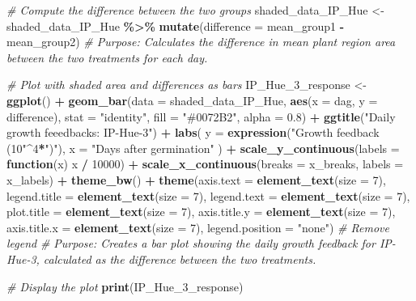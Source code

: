 \documentclass[
  11pt,
]{article}
\newenvironment{Shaded}{\begin{snugshade}}{\end{snugshade}}
\newcommand{\AttributeTok}[1]{\textcolor[rgb]{0.13,0.29,0.53}{#1}}
\newcommand{\CommentTok}[1]{\textcolor[rgb]{0.56,0.35,0.01}{\textit{#1}}}
\newcommand{\ControlFlowTok}[1]{\textcolor[rgb]{0.13,0.29,0.53}{\textbf{#1}}}
\newcommand{\DecValTok}[1]{\textcolor[rgb]{0.00,0.00,0.81}{#1}}
\newcommand{\FloatTok}[1]{\textcolor[rgb]{0.00,0.00,0.81}{#1}}
\newcommand{\FunctionTok}[1]{\textcolor[rgb]{0.13,0.29,0.53}{\textbf{#1}}}
\newcommand{\NormalTok}[1]{#1}
\newcommand{\OtherTok}[1]{\textcolor[rgb]{0.56,0.35,0.01}{#1}}
\newcommand{\SpecialCharTok}[1]{\textcolor[rgb]{0.81,0.36,0.00}{\textbf{#1}}}
\newcommand{\StringTok}[1]{\textcolor[rgb]{0.31,0.60,0.02}{#1}}
\begin{document}
\begin{Shaded}
\begin{Highlighting}[]
\CommentTok{\# Compute the difference between the two groups}
\NormalTok{shaded\_data\_IP\_Hue }\OtherTok{\textless{}{-}}\NormalTok{ shaded\_data\_IP\_Hue }\SpecialCharTok{\%\textgreater{}\%}
  \FunctionTok{mutate}\NormalTok{(}\AttributeTok{difference =}\NormalTok{ mean\_group1 }\SpecialCharTok{{-}}\NormalTok{ mean\_group2)}
\CommentTok{\# Purpose: Calculates the difference in mean plant region area between the two treatments for each day.}

\CommentTok{\# Plot with shaded area and differences as bars}
\NormalTok{IP\_Hue\_3\_response }\OtherTok{\textless{}{-}} \FunctionTok{ggplot}\NormalTok{() }\SpecialCharTok{+}
  \FunctionTok{geom\_bar}\NormalTok{(}\AttributeTok{data =}\NormalTok{ shaded\_data\_IP\_Hue, }\FunctionTok{aes}\NormalTok{(}\AttributeTok{x =}\NormalTok{ dag, }\AttributeTok{y =}\NormalTok{ difference), }\AttributeTok{stat =} \StringTok{"identity"}\NormalTok{, }\AttributeTok{fill =} \StringTok{"\#0072B2"}\NormalTok{, }\AttributeTok{alpha =} \FloatTok{0.8}\NormalTok{) }\SpecialCharTok{+}
  \FunctionTok{ggtitle}\NormalTok{(}\StringTok{"Daily growth feeedbacks: IP{-}Hue{-}3"}\NormalTok{) }\SpecialCharTok{+}
  \FunctionTok{labs}\NormalTok{(}
    \AttributeTok{y =} \FunctionTok{expression}\NormalTok{(}\StringTok{"Growth feedback (10"}\SpecialCharTok{\^{}}\DecValTok{4}\SpecialCharTok{*}\StringTok{")"}\NormalTok{), }
    \AttributeTok{x =} \StringTok{"Days after germination"}
\NormalTok{  ) }\SpecialCharTok{+}
  \FunctionTok{scale\_y\_continuous}\NormalTok{(}\AttributeTok{labels =} \ControlFlowTok{function}\NormalTok{(x) x }\SpecialCharTok{/} \DecValTok{10000}\NormalTok{) }\SpecialCharTok{+}
  \FunctionTok{scale\_x\_continuous}\NormalTok{(}\AttributeTok{breaks =}\NormalTok{ x\_breaks, }\AttributeTok{labels =}\NormalTok{ x\_labels) }\SpecialCharTok{+}
  \FunctionTok{theme\_bw}\NormalTok{() }\SpecialCharTok{+}
  \FunctionTok{theme}\NormalTok{(}\AttributeTok{axis.text =} \FunctionTok{element\_text}\NormalTok{(}\AttributeTok{size =} \DecValTok{7}\NormalTok{),}
        \AttributeTok{legend.title =} \FunctionTok{element\_text}\NormalTok{(}\AttributeTok{size =} \DecValTok{7}\NormalTok{),}
        \AttributeTok{legend.text =} \FunctionTok{element\_text}\NormalTok{(}\AttributeTok{size =} \DecValTok{7}\NormalTok{),}
        \AttributeTok{plot.title =} \FunctionTok{element\_text}\NormalTok{(}\AttributeTok{size =} \DecValTok{7}\NormalTok{),}
        \AttributeTok{axis.title.y =} \FunctionTok{element\_text}\NormalTok{(}\AttributeTok{size =} \DecValTok{7}\NormalTok{),}
        \AttributeTok{axis.title.x =} \FunctionTok{element\_text}\NormalTok{(}\AttributeTok{size =} \DecValTok{7}\NormalTok{),}
        \AttributeTok{legend.position =} \StringTok{"none"}\NormalTok{)       }\CommentTok{\# Remove legend}
\CommentTok{\# Purpose: Creates a bar plot showing the daily growth feedback for IP{-}Hue{-}3, calculated as the difference between the two treatments.}

\CommentTok{\# Display the plot}
\FunctionTok{print}\NormalTok{(IP\_Hue\_3\_response)}
\end{Highlighting}
\end{Shaded}
\end{document}
